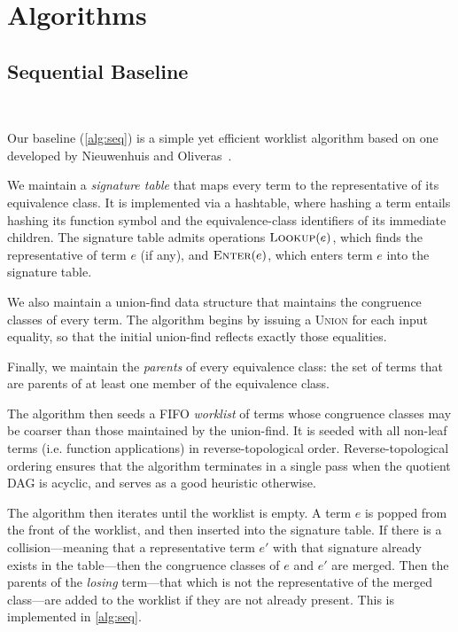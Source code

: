 \section{Algorithms}
\label{sec:algorithm}


\subsection{Sequential Baseline}~\label{sec:algorithm:no}

Our baseline (\autoref{alg:seq}) is a simple yet efficient worklist algorithm
based on one developed
by Nieuwenhuis and Oliveras~\cite{nieuwenhuis-oliveras-cc}.

We maintain a \emph{signature table} that maps every term to the representative
of its equivalence class. It is implemented via a hashtable, where hashing a
term entails hashing its function symbol and the equivalence-class identifiers
of its immediate children. The
signature table admits operations $\textsc{Lookup}(e)$, which finds the
representative of term $e$ (if any), and $\textsc{Enter}(e)$, which enters term
$e$ into the signature table.

We also maintain a union-find data structure that maintains the congruence
classes of every term. The algorithm begins by issuing a \textsc{Union} for
each input equality, so that the initial union-find reflects exactly those
equalities.

Finally, we maintain the \emph{parents} of every equivalence class: the set
of terms that are parents of at least one member of the equivalence class.

The algorithm then seeds a FIFO \emph{worklist} of terms whose congruence
classes may be coarser than those maintained by the union-find. It is seeded
with all non-leaf terms (i.e. function applications) in reverse-topological
order. Reverse-topological ordering ensures that the algorithm terminates in a
single pass when the quotient DAG is acyclic, and serves as a good heuristic
otherwise.

The algorithm then iterates until the worklist is empty. A term $e$ is popped
from the front of the worklist, and then inserted into the signature table. If
there is a collision---meaning that a representative term $e'$ with that
signature already exists in the table---then the congruence classes of $e$ and
$e'$ are merged. Then the parents of the \emph{losing} term---that which is
not the representative of the merged class---are added to the worklist if they
are not already present. This is implemented in \autoref{alg:seq}.

